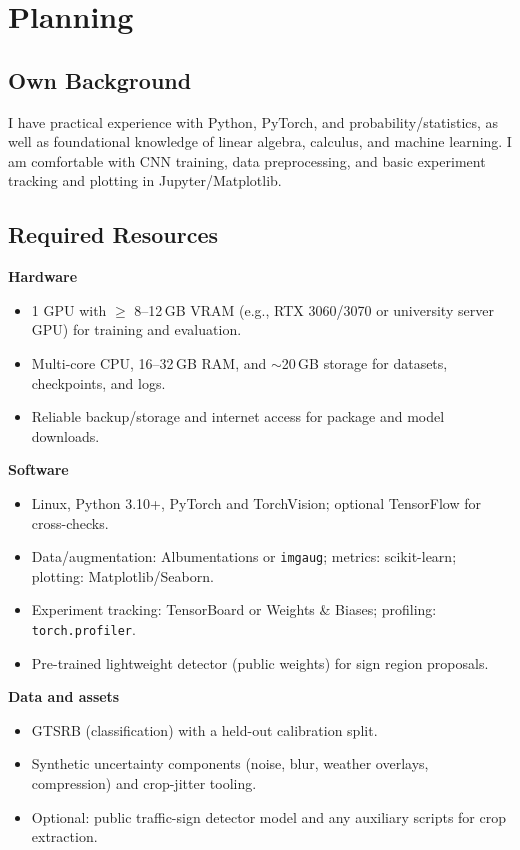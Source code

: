 \documentclass[11pt,a4paper]{article}
\begin{document}
\section{Planning}

\subsection{Own Background}

I have practical experience with Python, PyTorch, and probability/statistics, as well as foundational knowledge of linear algebra, calculus, and machine learning. I am comfortable with CNN training, data preprocessing, and basic experiment tracking and plotting in Jupyter/Matplotlib.

\subsection{Required Resources}

\textbf{Hardware}

\begin{itemize}
  \item 1 GPU with $\geq$ 8--12\,GB VRAM (e.g., RTX 3060/3070 or university server GPU) for training and evaluation.
  \item Multi-core CPU, 16--32\,GB RAM, and $\sim$20\,GB storage for datasets, checkpoints, and logs.
  \item Reliable backup/storage and internet access for package and model downloads.
\end{itemize}

\textbf{Software}

\begin{itemize}
  \item Linux, Python 3.10+, PyTorch and TorchVision; optional TensorFlow for cross-checks.
  \item Data/augmentation: Albumentations or \texttt{imgaug}; metrics: scikit-learn; plotting: Matplotlib/Seaborn.
  \item Experiment tracking: TensorBoard or Weights \& Biases; profiling: \texttt{torch.profiler}.
  \item Pre-trained lightweight detector (public weights) for sign region proposals.
\end{itemize}

\textbf{Data and assets}

\begin{itemize}
  \item GTSRB (classification) with a held-out calibration split.
  \item Synthetic uncertainty components (noise, blur, weather overlays, compression) and crop-jitter tooling.
  \item Optional: public traffic-sign detector model and any auxiliary scripts for crop extraction.
\end{itemize}
\end{document}
